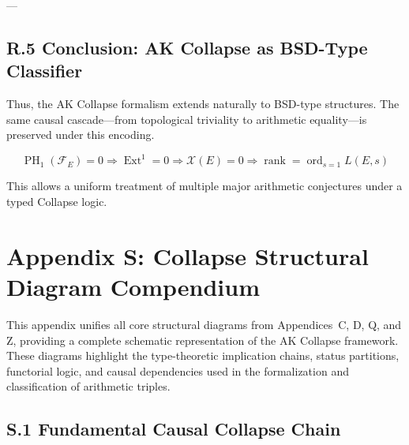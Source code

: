 \documentclass[11pt]{article}
\DeclareMathOperator{\Ext}{Ext}
\DeclareMathOperator{\PH}{PH}
\newcommand{\Sha}{\mathcal{X}}
\begin{document}
---

\subsection*{R.5 Conclusion: AK Collapse as BSD-Type Classifier}

Thus, the AK Collapse formalism extends naturally to BSD-type structures.  
The same causal cascade—from topological triviality to arithmetic equality—is preserved under this encoding.

\[
\boxed{
\PH_1(\mathcal{F}_E) = 0 \Rightarrow \Ext^1 = 0 \Rightarrow \Sha(E) = 0 \Rightarrow \operatorname{rank} = \operatorname{ord}_{s=1} L(E,s)
}
\]

This allows a uniform treatment of multiple major arithmetic conjectures under a typed Collapse logic.



\section*{Appendix S: Collapse Structural Diagram Compendium}

This appendix unifies all core structural diagrams from Appendices~C, D, Q, and Z, providing a complete schematic representation of the AK Collapse framework. These diagrams highlight the type-theoretic implication chains, status partitions, functorial logic, and causal dependencies used in the formalization and classification of arithmetic triples.

\subsection*{S.1 Fundamental Causal Collapse Chain}

\begin{center}
\end{center}
\end{document}

